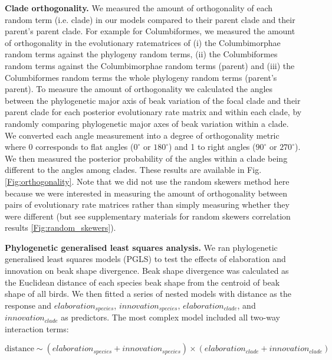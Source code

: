 \documentclass[12pt,letterpaper]{article}
\begin{document}
\textbf{Clade orthogonality.} We measured the amount of orthogonality of each random term (i.e.
clade) in our models compared to their parent clade and their parent's parent clade.
For example for Columbiformes, we measured the amount of orthogonality in the evolutionary ratematrices of (i) the Columbimorphae random terms against the phylogeny random terms, (ii) the Columbiformes random terms against the Columbimorphae random terms (parent) and (iii) the Columbiformes random terms the whole phylogeny random terms (parent's parent).
To measure the amount of orthogonality we calculated the angles between the phylogenetic major axis of beak variation of the focal clade and their parent clade for each posterior evolutionary rate matrix and within each clade, by randomly comparing phylogenetic major axes of beak variation within a clade.
We converted each angle measurement into a degree of orthogonality metric where 0 corresponds to flat angles ($0^\circ$ or  $180^\circ$) and 1 to right angles ($90^\circ$ or $270^\circ$).
We then measured the posterior probability of the angles within a clade being different to the angles among clades.
These results are available in Fig. \ref{Fig:orthogonality}.
Note that we did not use the random skewers method here \cite{cheverud2007research} because we were interested in measuring the amount of orthogonality between pairs of evolutionary rate matrices rather than simply measuring whether they were different (but see supplementary materials for random skewers correlation results \ref{Fig:random_skewers}). %

\textbf{Phylogenetic generalised least squares analysis.} We ran phylogenetic generalised least squares models (PGLS) to test the effects of elaboration and innovation on beak shape divergence.
Beak shape divergence was calculated as the Euclidean distance of each species beak shape from the centroid of beak shape of all birds.
We then fitted a series of nested models with distance as the response and $elaboration_{species}$, $innovation_{species}$, $elaboration_{clade}$, and $innovation_{clade}$ as predictors.
The most complex model included all two-way interaction terms:

\begin{equation}
\text{distance} \mathtt{\sim} (elaboration_{species} + innovation_{species}) \times (elaboration_{clade} + innovation_{clade})
\end{equation}
\end{document}
